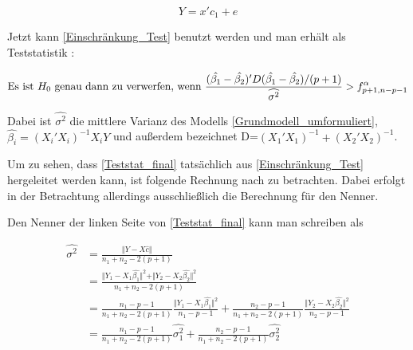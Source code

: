 \documentclass[12pt,a4paper]{article}
\theoremstyle{definition}
\theoremstyle{definition}
\theoremstyle{definition}
\theoremstyle{definition}
\begin{document}
\begin{equation*}
Y = x' c_1 + e
\end{equation*}

Jetzt kann \eqref{Einschränkung_Test} benutzt werden und man erhält als Teststatistik : 

\begin{equation}
\textnormal{Es ist } H_0 \textnormal{ genau dann zu verwerfen, wenn } 
\frac{(\hat{\beta_1}-\hat{\beta_2})'D (\hat{\beta_1}-\hat{\beta_2})/(p+1)}{\widehat{\sigma^2}} > f^{\alpha}_{p+1,n-p-1}\label{Teststat_final}
\end{equation}

Dabei ist $\widehat{\sigma^2}$ die mittlere Varianz des Modells \eqref{Grundmodell_umformuliert}, $\hat{\beta_i} = (X_i'X_i)^{-1}X_iY$ und außerdem bezeichnet \gls{D}=$(X_1'X_1)^{-1}+(X_2'X_2)^{-1}$. 

Um zu sehen, dass \eqref{Teststat_final} tatsächlich aus \eqref{Einschränkung_Test} hergeleitet werden kann, ist folgende Rechnung nach \cite[115]{Liu64} zu betrachten. Dabei erfolgt in der Betrachtung allerdings ausschließlich die Berechnung für den Nenner.

%
%
%

Den Nenner der linken Seite von \eqref{Teststat_final} kann man schreiben als

\begin{align*}
\widehat{\sigma^2}  &= \frac{\Vert Y-X \hat{c} \Vert}{n_1 + n_2 - 2(p+1)} \\
				&= \frac{\Vert Y_1 - X_1 \hat{\beta_1} \Vert^2 + \Vert Y_2 - X_2 \hat{\beta_2} \Vert^2}{n_1+n_2-2(p+1)} \\
				&= \frac{n_1-p-1}{n_1+n_2-2(p+1)} \frac{\Vert Y_1 - X_1 \hat{\beta_1} \Vert^2}{n_1-p-1}+ \frac{n_2-p-1}{n_1+n_2-2(p+1)} \frac{\Vert Y_2 - X_2 \hat{\beta_2} \Vert^2}{n_2-p-1} \\
				&= \frac{n_1-p-1}{n_1+n_2-2(p+1)} \widehat{\sigma_{1}^2}+ \frac{n_2-p-1}{n_1+n_2-2(p+1)} \widehat{\sigma_{2}^2}
\end{align*}
\end{document}
